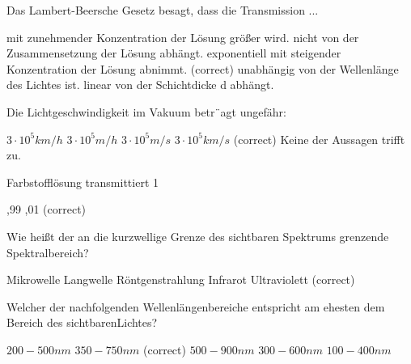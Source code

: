 \documentclass[11pt]{exam}
\begin{document}
\setlength{\voffset}{-0.5in}
\setlength{\headsep}{5pt}

\hspace{2mm}
 \hspace{5mm}
\vspace{4mm}

\begin{questions}

\question Das Lambert-Beersche Gesetz besagt, dass die Transmission ...

\begin{choices}
	\choice mit zunehmender Konzentration der Lösung größer wird.
	\choice nicht von der Zusammensetzung der Lösung abhängt.
	\choice exponentiell mit steigender Konzentration der Lösung abnimmt. (correct)
	\choice unabhängig von der Wellenlänge des Lichtes ist.
	\choice linear von der Schichtdicke d abhängt.
\end{choices}

\vspace{3mm}\question Die Lichtgeschwindigkeit im Vakuum betr¨agt ungefähr:

\begin{choices}
	\choice \( 3 \cdot10^5 km/h \)
	\choice \( 3 \cdot10^5 m/h \)
	\choice \( 3 \cdot10^5 m/s \)
	\choice \( 3 \cdot10^5 km/s \) (correct)
	\choice Keine der Aussagen trifft zu.
\end{choices}

\vspace{3mm}\question Farbstofflösung transmittiert 1 %

\begin{choices}
	,99
	,01
	 (correct)
\end{choices}

\vspace{3mm}\question Wie heißt der an die kurzwellige Grenze des sichtbaren Spektrums grenzende Spektralbereich?

\begin{choices}
	\choice Mikrowelle
	\choice Langwelle
	\choice Röntgenstrahlung
	\choice Infrarot
	\choice Ultraviolett (correct)
\end{choices}

\vspace{3mm}\question Welcher der nachfolgenden Wellenlängenbereiche entspricht am ehesten dem Bereich des sichtbarenLichtes?

\begin{choices}
	\choice \( 200 - 500 nm \)
	\choice \( 350 - 750 nm \) (correct)
	\choice \( 500 - 900 nm \)
	\choice \( 300 - 600 nm \)
	\choice \( 100 - 400 nm \)
\end{choices}

\vspace{3mm}\end{questions}
\end{document}
